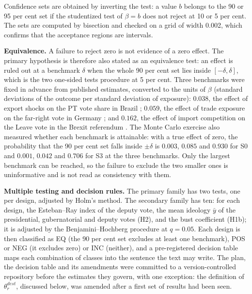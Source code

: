 \documentclass[
	11pt,				%
	oneside,			%
	a4paper,			%
	english,			%
	english				%
	]{abntex2ppgsi}
\theoremstyle{plain}
\theoremstyle{remark}
\theoremstyle{plain}%
\theoremstyle{remark}%
\begin{document}
Confidence sets are obtained by inverting the test: a value $b$ belongs to the 90 or 95 per cent set if the studentized test of $\beta = b$ does not reject at 10 or 5 per cent. The sets are computed by bisection and checked on a grid of width 0.002, which confirms that the acceptance regions are intervals.

\textbf{Equivalence.} A failure to reject zero is not evidence of a zero effect. The primary hypothesis is therefore also stated as an equivalence test: an effect is ruled out at a benchmark $\delta$ when the whole 90 per cent set lies inside $[-\delta, \delta]$, which is the two one-sided tests procedure at 5 per cent. Three benchmarks were fixed in advance from published estimates, converted to the units of $\beta$ (standard deviations of the outcome per standard deviation of exposure): $0.038$, the effect of export shocks on the PT vote share in Brazil \cite{Rettl}; $0.059$, the effect of trade exposure on the far-right vote in Germany \cite{dippel}; and $0.162$, the effect of import competition on the Leave vote in the Brexit referendum \cite{colantone}.
The Monte Carlo exercise also measured whether each benchmark is attainable: with a true effect of zero, the probability that the 90 per cent set falls inside $\pm\delta$ is $0.003$, $0.085$ and $0.930$ for S0 and $0.001$, $0.042$ and $0.706$ for S3 at the three benchmarks. Only the largest benchmark can be reached, so the failure to exclude the two smaller ones is uninformative and is not read as consistency with them.

\textbf{Multiple testing and decision rules.} The primary family has two tests, one per design, adjusted by Holm's method. The secondary family has ten: for each design, the Esteban--Ray index of the deputy vote, the mean ideology $\bar{y}$ of the presidential, gubernatorial and deputy votes (H2), and the bust coefficient (H1b); it is adjusted by the Benjamini--Hochberg procedure at $q = 0.05$. Each design is then classified as EQ (the 90 per cent set excludes at least one benchmark), POS or NEG (it excludes zero) or INC (neither), and a pre-registered decision table maps each combination of classes into the sentence the text may write. The plan, the decision table and its amendments were committed to a version-controlled repository before the estimates they govern, with one exception: the definition of $\theta^{dest}_r$, discussed below, was amended after a first set of results had been seen.
\end{document}
